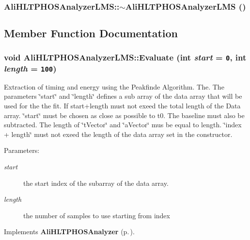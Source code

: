 \subsubsection{\setlength{\rightskip}{0pt plus 5cm}Ali\-HLTPHOSAnalyzer\-LMS::$\sim${\bf Ali\-HLTPHOSAnalyzer\-LMS} ()\hspace{0.3cm}{\tt  [virtual]}}\label{classAliHLTPHOSAnalyzerLMS_a4}




\subsection{Member Function Documentation}
\subsubsection{\setlength{\rightskip}{0pt plus 5cm}void Ali\-HLTPHOSAnalyzer\-LMS::Evaluate (int {\em start} = {\tt 0}, int {\em length} = {\tt 100})\hspace{0.3cm}{\tt  [virtual]}}\label{classAliHLTPHOSAnalyzerLMS_a5}


Extraction of timing and energy using the Peakfinde Algorithm. The. The parameters \char`\"{}start\char`\"{} and \char`\"{}length\char`\"{} defines a sub array of the data array that will be used for the the fit. If start+length must not exeed the total length of the Data array. \char`\"{}start\char`\"{} must be chosen as close as possible to t0. The baseline must also be subtracted. The length of \char`\"{}t\-Vector\char`\"{} and \char`\"{}a\-Vector\char`\"{} mus be equal to length. \char`\"{}index + length\char`\"{} must not exeed the length of the data array set in the constructor. \begin{Desc}
\item[Parameters:]
\begin{description}
\item[{\em start}]the start index of the subarray of the data array. \item[{\em length}]the number of samples to use starting from index \end{description}
\end{Desc}


Implements {\bf Ali\-HLTPHOSAnalyzer} {\rm (p.\,\pageref{classAliHLTPHOSAnalyzer_a14})}.
